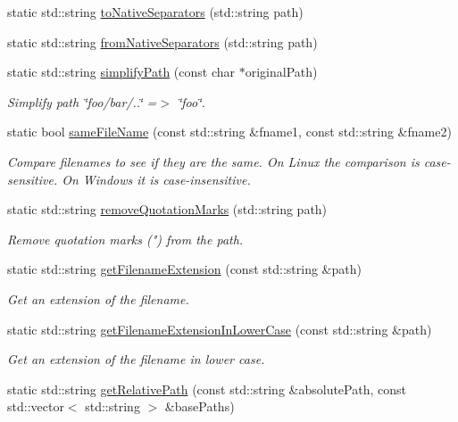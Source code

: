 \begin{DoxyCompactItemize}
\item 
static std\-::string \hyperlink{class_path_a8180f83d77e13a07d5c58904d68a1f69}{to\-Native\-Separators} (std\-::string path)
\item 
static std\-::string \hyperlink{class_path_a3f8fc5a3d2f0e35b764eb97d4ad173b2}{from\-Native\-Separators} (std\-::string path)
\item 
static std\-::string \hyperlink{class_path_a3e04135bec672da9bb48da478bb15078}{simplify\-Path} (const char $\ast$original\-Path)
\begin{DoxyCompactList}\small\item\em Simplify path \char`\"{}foo/bar/..\char`\"{} =$>$ \char`\"{}foo\char`\"{}. \end{DoxyCompactList}\item 
static bool \hyperlink{class_path_a994433b198ffb938b6ad8aec2d741a9a}{same\-File\-Name} (const std\-::string \&fname1, const std\-::string \&fname2)
\begin{DoxyCompactList}\small\item\em Compare filenames to see if they are the same. On Linux the comparison is case-\/sensitive. On Windows it is case-\/insensitive. \end{DoxyCompactList}\item 
static std\-::string \hyperlink{class_path_a694b039b6ef96e80c0db2113862d17ba}{remove\-Quotation\-Marks} (std\-::string path)
\begin{DoxyCompactList}\small\item\em Remove quotation marks (") from the path. \end{DoxyCompactList}\item 
static std\-::string \hyperlink{class_path_a765e79c65ddf06d2ab29166c3c9703fb}{get\-Filename\-Extension} (const std\-::string \&path)
\begin{DoxyCompactList}\small\item\em Get an extension of the filename. \end{DoxyCompactList}\item 
static std\-::string \hyperlink{class_path_aeb44f68420d5c45abaa34a2f1f0884af}{get\-Filename\-Extension\-In\-Lower\-Case} (const std\-::string \&path)
\begin{DoxyCompactList}\small\item\em Get an extension of the filename in lower case. \end{DoxyCompactList}\item 
static std\-::string \hyperlink{class_path_aaa2c14e03d07762c40708d653a46444b}{get\-Relative\-Path} (const std\-::string \&absolute\-Path, const std\-::vector$<$ std\-::string $>$ \&base\-Paths)

\end{DoxyCompactItemize}
